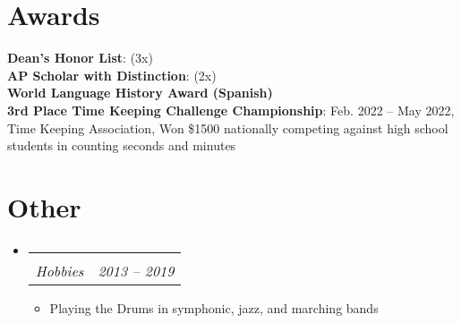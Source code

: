\documentclass[letterpaper,11pt]{article}
\makeatletter
\newcommand{\resumeItem}[1]{
  \item\small{
    {#1 \vspace{-2pt}}
  }
}
\newcommand{\resumeSubheading}[4]{
  \vspace{-2pt}\item
    \begin{tabular*}{0.97\textwidth}[t]{l@{\extracolsep{\fill}}r}
      \textbf{#1} & #2 \\
      \textit{\small#3} & \textit{\small #4} \\
    \end{tabular*}\vspace{-7pt}
}
\newcommand{\resumeSubHeadingListStart}{\begin{itemize}[leftmargin=0.15in, label={}]}
\newcommand{\resumeSubHeadingListEnd}{\end{itemize}}
\newcommand{\resumeItemListStart}{\begin{itemize}}
\newcommand{\resumeItemListEnd}{\end{itemize}\vspace{-5pt}}
\makeatother
\begin{document}
\section{Awards}
 \begin{itemize}[leftmargin=0.15in, label={}]
    \small{\item{
     \textbf{Dean’s Honor List}{: (3x)} \\
     \textbf{AP Scholar with Distinction}{: (2x)} \\
     \textbf{World Language History Award (Spanish)}{ } \\
     \textbf{3rd Place Time Keeping Challenge Championship}{: Feb. 2022 -- May 2022, Time Keeping Association, Won \$1500 nationally competing against high school students in counting seconds and minutes}
    }}
 \end{itemize}

\section{Other}
\resumeSubHeadingListStart
    \resumeSubheading
      {}{ }
      {Hobbies}{2013 -- 2019}
      \resumeItemListStart
        \resumeItem{Playing the Drums in symphonic, jazz, and marching bands}
      \resumeItemListEnd
\resumeSubHeadingListEnd
\end{document}
